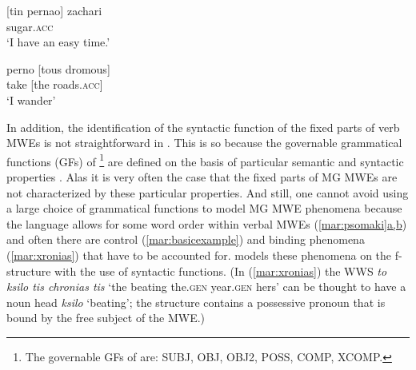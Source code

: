 \documentclass[output=paper]{langsci/langscibook}
\begin{document}
\ea\label{mar:zaxari}
\gll \textnormal{[}tin             pernao\textnormal{]}  zachari\\
[her.\textsc{acc}.\textsc{fem}   pass.\textsc{1st}]     sugar.\textsc{acc}\\
\glt `I have an easy time.’
\z

\ea\label{mar:dromous}
\gll perno \textnormal{[}tous dromous\textnormal{]}\\
take    [the  roads.\textsc{acc}] \\
\glt      `I wander’
\z

\begin{exe}
\ex \label{mar:psomaki}
\begin{xlist}
\settowidth{}
\end{xlist}
\end{exe}

      
In addition, the identification of the syntactic function of the fixed parts of verb MWEs is not straightforward in . This is so because the governable grammatical functions (GFs) of \footnote{The governable GFs of  are: SUBJ, OBJ, OBJ2, POSS, COMP, XCOMP.} are defined on the basis of particular semantic and syntactic properties \citep{dalrymplelfg}. Alas it is very often the case that the fixed parts of MG MWEs are not characterized by these particular properties. And still, one cannot avoid using a large choice of grammatical functions to model MG MWE phenomena because the language allows for some word order  within verbal MWEs (\hyperref[mar:psomaki]{\ref*{mar:psomaki}a,b}) %
and often there are control (\ref{mar:basicexample}) and binding phenomena (\ref{mar:xronias}) that have to be accounted for.  models these phenomena on the f-structure with the use of syntactic functions. (In (\ref{mar:xronias}) the WWS \textit{to ksilo tis chronias tis} `the beating the.\textsc{gen} year.\textsc{gen}  hers' can be thought to have a noun head \textit{ksilo} `beating'; the structure contains a possessive pronoun that is bound by the free subject of the MWE.)
\end{document}
